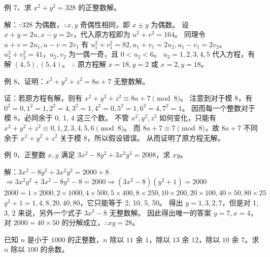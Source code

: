 \begin{questions}
\question 例 7、求 $x^2 + y^2 = 328$ 的正整数解。

\begin{solution}
解：$\because 328$ 为偶数，$\therefore x, y$ 奇偶性相同，即 $x \pm y$ 为偶数。
设 $x + y = 2u, x - y = 2v$，代入原方程即为 $u^2 + v^2 = 164$。
同理令 $u + v = 2u_1, u - v = 2v_1$ 有 $u_1^2 + v_1^2 = 82, u_1 + v_1 = 2u_2, u_1 - v_1 = 2v_2$。
$u_2^2 + v_2^2 = 41$，$u_2, v_2$ 为一偶一奇，且 $0 < u_2 < 6$。
$u_2 = 1, 2, 3, 4, 5$ 代入方程，有解 $(4, 5), (5, 4)$。
$\therefore$ 原方程解 $x = 18, y = 2$ 或 $x = 2, y = 18$。
\end{solution}

\question 例 8、证明：$x^2 + y^2 + z^2 = 8a + 7$ 无整数解。

\begin{solution}
证：若原方程有解，则有 $x^2 + y^2 + z^2 \equiv 8a + 7 \pmod 8$。
注意到对于模 8，有 $0^2 = 0, 1^2 = 1, 2^2 = 4, 3^2 = 1, 4^2 = 0, 5^2 = 1, 6^2 = 4, 7^2 = 1$。
因而每一个整数对于模 8，必同余于 0, 1, 4 这三个数。
不管 $x^2, y^2, z^2$ 如何变化，只能有 $x^2 + y^2 + z^2 \equiv 0, 1, 2, 3, 4, 5, 6 \pmod 8$。
而 $8a + 7 \equiv 7 \pmod 8$，故 $8a + 7$ 不同余于 $x^2 + y^2 + z^2$ 关于模 8，所以假设错误。
从而证明了原方程无解。
\end{solution}

\question 例 9、正整数 $x, y$ 满足 $3x^2 - 8y^2 + 3x^2y^2 = 2008$，求 $xy$。

\begin{solution}
解：$3x^2 - 8y^2 + 3x^2y^2 = 2000 + 8$
$\Rightarrow 3x^2y^2 + 3x^2 - 8y^2 - 8 = 2000 \Rightarrow (3x^2 - 8)(y^2 + 1) = 2000$
$2000 = 1 \times 2000, 2 \times 1000, 4 \times 500, 5 \times 400, 8 \times 250, 10 \times 200, 20 \times 100, 40 \times 50, 80 \times 25$
$y^2 + 1 = 1, 4, 8, 20, 40, 80$，它只能等于 2, 10, 5, 50。
得出 $y = 1, 3, 2, 7$，但是对 1, 3, 2 来说，另外一个式子 $3x^2 - 8$ 无整数解。
因此得出唯一的答案 $y = 7, x = 4$，对 $2000 = 40 \times 50$ 的分解成立，$\therefore xy = 28$。
\end{solution}

\question 已知 $n$ 是小于 $1000$ 的正整数，$n$ 除以 $11$ 余 $1$，除以 $13$ 余 $12$，除以 $10$ 余 $7$。求 $n$ 除以 $100$ 的余数。


\end{questions}
